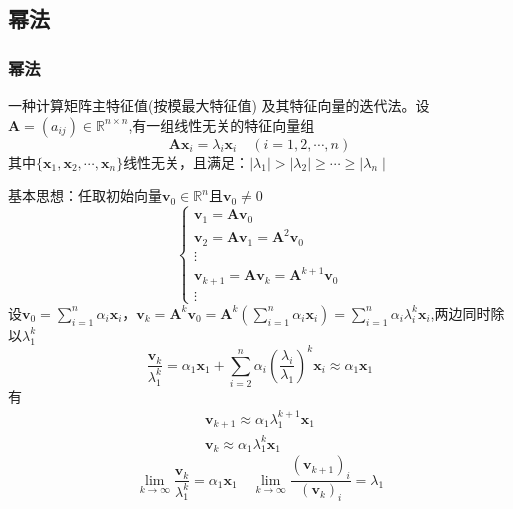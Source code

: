\subsection{幂法}
\subsubsection{幂法}
一种计算矩阵主特征值(按模最大特征值) 及其特征向量的迭代法。设$\boldsymbol{A}=(a_{ij})\in\mathbb{R}^{n\times n}$,有一组线性无关的特征向量组
\[
    \boldsymbol{A}\boldsymbol{x}_i=\lambda_i\boldsymbol{x}_i\quad(i=1,2,\cdots,n)    
\]
其中$\{\boldsymbol{x}_1,\boldsymbol{x}_2,\cdots,\boldsymbol{x}_n\}$线性无关，且满足：$\mid\lambda_1\mid>\mid\lambda_2\mid\geq\cdots\geq\mid\lambda_n\mid$

\begin{note}
    基本思想：任取初始向量$\boldsymbol{v}_0\in\mathbb{R}^n$且$\boldsymbol{v}_0\neq0$
    \[
        \left\{
            \begin{array}{l}
                \boldsymbol{v}_1=\boldsymbol{A}\boldsymbol{v}_0\\
                \boldsymbol{v}_2=\boldsymbol{A}\boldsymbol{v}_1=\boldsymbol{A}^2\boldsymbol{v}_0\\
                \vdots\\
                \boldsymbol{v}_{k+1}=\boldsymbol{A}\boldsymbol{v}_k=\boldsymbol{A}^{k+1}\boldsymbol{v}_0\\
                \vdots
            \end{array}
            \right.
    \]
    设$\boldsymbol{v}_0 = \sum\limits_{i = 1}^{n}\alpha_{i} \boldsymbol{x}_{i}$，$\boldsymbol{v}_{k} = \boldsymbol{A}^{k}\boldsymbol{v}_0 = \boldsymbol{A}^{k}\left( \sum\limits_{i = 1}^{n}\alpha_{i} \boldsymbol{x}_{i} \right) = \sum\limits_{i = 1}^{n}\alpha_{i}\lambda_{i}^{k}\boldsymbol{x}_{i}$,两边同时除以$\lambda_{1}^{k}$
    \[
        \dfrac{\boldsymbol{v}_{k}}{\lambda_{1}^{k}} = \alpha_{1}\boldsymbol{x}_{1} + \sum\limits_{i = 2}^{n}\alpha_{i}\left( \dfrac{\lambda_{i}}{\lambda_{1}} \right)^{k}\boldsymbol{x}_{i}\approx \alpha_1\boldsymbol{x}_1
    \]
    有
    \[
        \begin{array}{l}
            \boldsymbol{v}_{k+1}\approx \alpha_1\lambda_1^{k+1}\boldsymbol{x}_1\\
            \boldsymbol{v}_{k}\approx \alpha_1\lambda_1^k\boldsymbol{x}_1
        \end{array}
    \]
    \[
        \lim_{k\to\infty}\frac{\boldsymbol{v}_k}{\lambda_1^k}=\alpha_1\boldsymbol{x}_1\quad\lim_{k\to\infty}\frac{(\boldsymbol{v}_{k+1})_i}{(\boldsymbol{v}_k)_i}=\lambda_1
    \]
\end{note}
